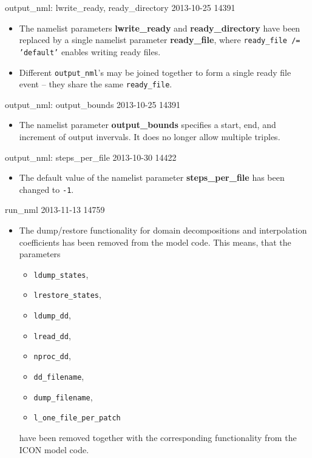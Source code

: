 \begin{changeitem}{output\_nml: lwrite\_ready, ready\_directory}{ 2013-10-25 }{ 14391 }
  \begin{itemize}
   \item The namelist parameters \textbf{lwrite\_ready} and \textbf{ready\_directory} have been replaced
         by a single namelist parameter \textbf{ready\_file}, where \texttt{ready\_file /= 'default'} enables
         writing ready files. 
   \item Different \texttt{output\_nml}'s may be joined together to form a single ready file event -- they
         share the same \texttt{ready\_file}.
  \end{itemize}
\end{changeitem}

\begin{changeitem}{output\_nml: output\_bounds }{ 2013-10-25 }{ 14391 }
  \begin{itemize}
   \item The namelist parameter \textbf{output\_bounds} specifies a start, end, and increment of 
         output invervals.
         It does no longer allow multiple triples.
  \end{itemize}
\end{changeitem}

\begin{changeitem}{output\_nml: steps\_per\_file }{ 2013-10-30 }{ 14422 }
  \begin{itemize}
   \item The default value of the namelist parameter \textbf{steps\_per\_file} has been changed to \texttt{-1}.
  \end{itemize}
\end{changeitem}

\begin{changeitem}{run\_nml}{ 2013-11-13 }{ 14759 }
  \begin{itemize}
   \item The dump/restore functionality for domain decompositions and interpolation coefficients has
         been removed from the model code.
         This means, that the parameters
         \begin{itemize}
           \item \texttt{ldump\_states},
           \item \texttt{lrestore\_states},
           \item \texttt{ldump\_dd}, 
           \item \texttt{lread\_dd},  
           \item \texttt{nproc\_dd},  
           \item \texttt{dd\_filename},
           \item \texttt{dump\_filename},
           \item \texttt{l\_one\_file\_per\_patch}
         \end{itemize}
         have been removed together with the corresponding functionality from the ICON model code.
  \end{itemize}
\end{changeitem}

